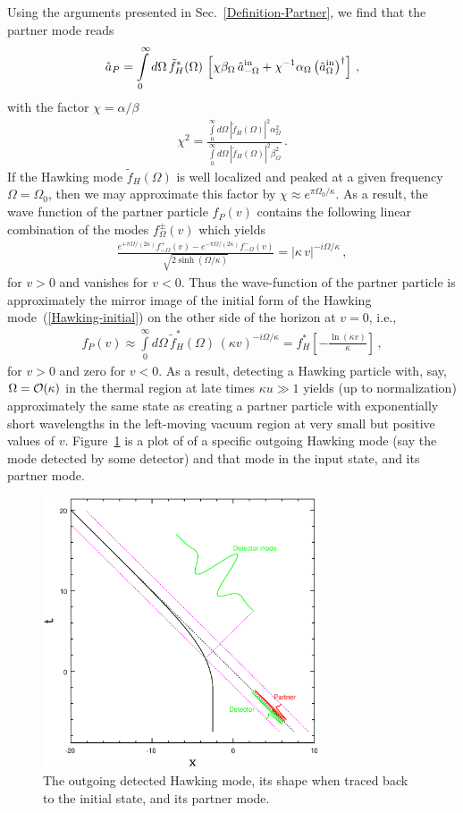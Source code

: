 \documentclass[aps,prd,showpacs,amssymb,nofootinbib,twocolumn]{revtex4}
\newcommand{\bea}{\begin{eqnarray}}
\newcommand{\ea}{\end{eqnarray}}
\newcommand{\ord}{{\cal O}}
\begin{document}
Using the arguments presented in Sec.~\ref{Definition-Partner}, 
we find that the partner mode reads 
%
\bea
\hat a_P
=
\int\limits_0^\infty d\Omega\,\tilde f_H^*(\Omega)\,
\left[
\chi\beta_\Omega\,\hat a_{-\Omega}^{\rm in}
+
\chi^{-1}\alpha_\Omega\left(\hat a_{\Omega}^{\rm in}\right)^\dagger
\right]
\,,
\ea
%
with the factor $\chi=\alpha/\beta$
%
\bea
\chi^2
=
\frac{\int\limits_0^\infty d\Omega\,|\tilde f_H(\Omega)|^2 \alpha_\Omega^2}
{\int\limits_0^\infty d\Omega\,|\tilde f_H(\Omega)|^2 \beta_\Omega^2}
\,.
\ea
%
If the Hawking mode $\tilde f_H(\Omega)$ is well localized and peaked at a 
given frequency $\Omega=\Omega_0$, then we may approximate this factor by 
$\chi\approx e^{ \pi\Omega_0/\kappa}$.
%
As a result, the wave function of the partner particle $f_P(v)$ contains the 
following linear combination of the modes $f^\pm_\Omega(v)$ which yields  
%
\bea
\label{cancel}
\frac{e^{+\pi\Omega/(2\kappa)} f^+_{-\Omega}(v) -  
e^{-\pi\Omega/(2\kappa)}  f^-_{-\Omega}(v)}
{\sqrt{2\sinh(\Omega/\kappa)}}
=
\left|\kappa\,v\right|^{-i\Omega/\kappa} 
\,,
\ea
%
for $v>0$ and vanishes for $v<0$.
%
Thus the wave-function of the partner particle is approximately the mirror 
image of the initial form of the Hawking mode~(\ref{Hawking-initial}) 
on the other side of the horizon at $v=0$, i.e., 
%
\bea
\label{partner-mirror}
f_P(v)
\approx 
\int\limits_0^\infty d\Omega\,\tilde f_H^*(\Omega)\, 
(\kappa v)^{-i\Omega/\kappa} 
=
f^*_H\left[-\frac{\ln(\kappa v)}{\kappa}\right] 
\,,
\ea
%
for $v>0$ and zero for $v<0$. 
%
As a result, detecting a Hawking particle with, say, $\Omega=\ord(\kappa)$ 
in the thermal region at late times $\kappa u\gg1$ yields (up to normalization)
approximately the same state as creating a partner particle with exponentially 
short wavelengths in the left-moving vacuum region at very small but positive 
values of $v$.
%
Figure~\ref{figure3} is a plot of of a specific outgoing Hawking mode 
(say the mode detected by some detector) and that mode in the input state, 
and its partner mode.


\begin{figure}[ht]
\includegraphics[height=8cm]{fig3.ps}
\caption{\label{figure3} 
The outgoing detected Hawking mode, its shape when traced back to the 
initial state, and its partner mode.}
\end{figure}
\end{document}
